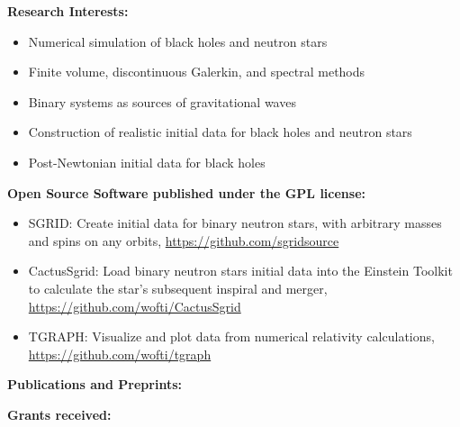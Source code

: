 \documentclass[11pt]{article}
\begin{document}
\bigskip

{\bf Research Interests:}
\begin{itemize}
\item	Numerical simulation of black holes and
	neutron stars
\item	Finite volume, discontinuous Galerkin, and spectral methods
\item	Binary systems as sources of gravitational waves
\item	Construction of realistic initial data for
	black holes and neutron stars
\item	Post-Newtonian initial data for black holes
\end{itemize}

\bigskip

{\bf Open Source Software published under the GPL license:}
\begin{itemize}
\item   SGRID: Create initial data for binary neutron stars, with arbitrary
	masses and spins on any orbits,
	\href{https://github.com/sgridsource}{https://github.com/sgridsource}
\item	CactusSgrid: Load binary neutron stars initial data into the Einstein
	Toolkit	to calculate the star's subsequent inspiral and merger,
	\href{https://github.com/wofti/CactusSgrid}{https://github.com/wofti/CactusSgrid}
\item	TGRAPH: Visualize and plot data from numerical relativity
	calculations,\\
	\href{https://github.com/wofti/tgraph}{https://github.com/wofti/tgraph}
\end{itemize}


\medskip

{\bf Publications and Preprints:}
\medskip




\bigskip

{\bf Grants received:}
\end{document}
